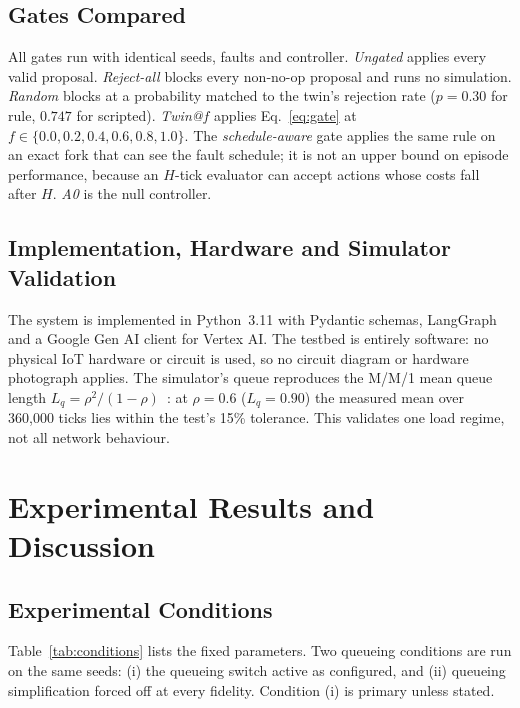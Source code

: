 \documentclass[conference]{IEEEtran}
\begin{document}
\subsection{Gates Compared}

All gates run with identical seeds, faults and controller. \emph{Ungated} applies every valid proposal. \emph{Reject-all} blocks every non-no-op proposal and runs no simulation. \emph{Random} blocks at a probability matched to the twin's rejection rate ($p=0.30$ for rule, $0.747$ for scripted). \emph{Twin@$f$} applies Eq.~\eqref{eq:gate} at $f\in\{0.0,0.2,0.4,0.6,0.8,1.0\}$. The \emph{schedule-aware} gate applies the same rule on an exact fork that can see the fault schedule; it is not an upper bound on episode performance, because an $H$-tick evaluator can accept actions whose costs fall after $H$. \emph{A0} is the null controller.

\subsection{Implementation, Hardware and Simulator Validation}

The system is implemented in Python~3.11 with Pydantic schemas, LangGraph and a Google Gen AI client for Vertex AI. The testbed is entirely software: no physical IoT hardware or circuit is used, so no circuit diagram or hardware photograph applies. The simulator's queue reproduces the M/M/1 mean queue length $L_q=\rho^2/(1-\rho)$~\cite{probcomputing}: at $\rho=0.6$ ($L_q=0.90$) the measured mean over 360{,}000 ticks lies within the test's 15\% tolerance. This validates one load regime, not all network behaviour.

\section{Experimental Results and Discussion}

\subsection{Experimental Conditions}

Table~\ref{tab:conditions} lists the fixed parameters. Two queueing conditions are run on the same seeds: (i) the queueing switch active as configured, and (ii) queueing simplification forced off at every fidelity. Condition (i) is primary unless stated.
\end{document}
